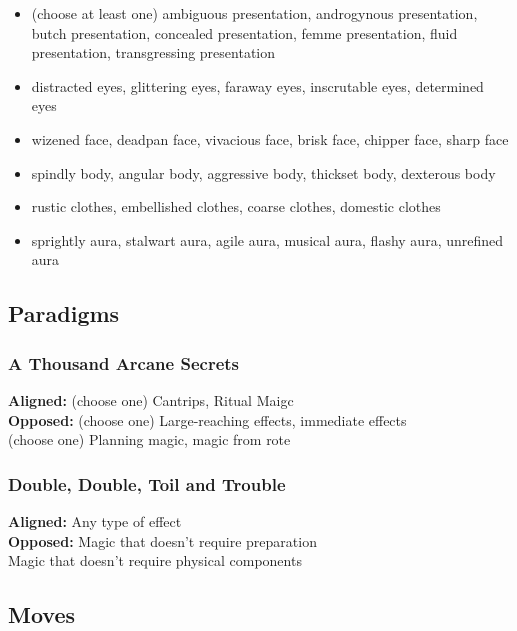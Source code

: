 \documentclass[
  oneside,
  statementpaper,
  9pt]{memoir}
\begin{document}
\begin{itemize}
\tightlist
\item
  (choose at least one) ambiguous presentation, androgynous
  presentation, butch presentation, concealed presentation, femme
  presentation, fluid presentation, transgressing presentation
\item
  distracted eyes, glittering eyes, faraway eyes, inscrutable eyes,
  determined eyes
\item
  wizened face, deadpan face, vivacious face, brisk face, chipper face,
  sharp face
\item
  spindly body, angular body, aggressive body, thickset body, dexterous
  body
\item
  rustic clothes, embellished clothes, coarse clothes, domestic clothes
\item
  sprightly aura, stalwart aura, agile aura, musical aura, flashy aura,
  unrefined aura
\end{itemize}

\hypertarget{paradigms-1}{%
\subsection{Paradigms}\label{paradigms-1}}

\hypertarget{a-thousand-arcane-secrets}{%
\subsubsection{A Thousand Arcane
Secrets}\label{a-thousand-arcane-secrets}}

\textbf{Aligned:} (choose one) Cantrips, Ritual Maigc\\
\textbf{Opposed:} (choose one) Large-reaching effects, immediate
effects\\
(choose one) Planning magic, magic from rote

\hypertarget{double-double-toil-and-trouble}{%
\subsubsection{Double, Double, Toil and
Trouble}\label{double-double-toil-and-trouble}}

\textbf{Aligned:} Any type of effect\\
\textbf{Opposed:} Magic that doesn't require preparation\\
Magic that doesn't require physical components

\hypertarget{moves-1}{%
\subsection{Moves}\label{moves-1}}
\end{document}
